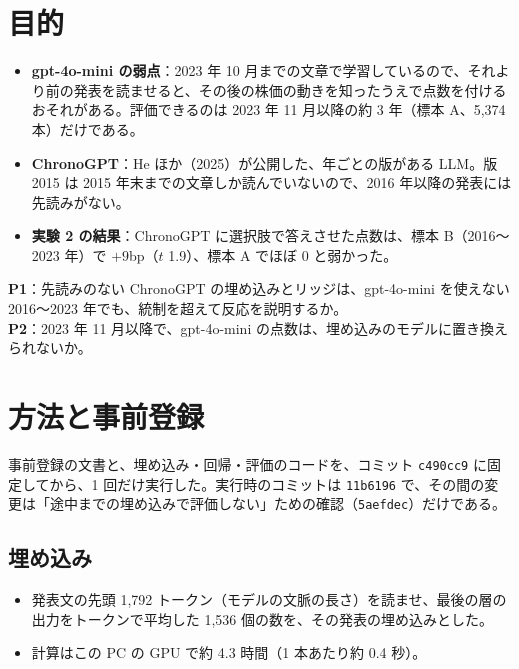 \documentclass[xelatex,ja=standard,jafont=haranoaji,a4paper,10pt,openany]{bxjsreport}
\newcommand{\code}[1]{\texttt{#1}}
\begin{document}
\setcounter{tocdepth}{1}
{\small\tableofcontents}

\chapter{目的}\label{ch:intro}

\begin{itemize}
\item \textbf{gpt-4o-mini の弱点}：2023 年 10 月までの文章で学習しているので、それより前の発表を読ませると、その後の株価の動きを知ったうえで点数を付けるおそれがある。評価できるのは 2023 年 11 月以降の約 3 年（標本 A、5,374 本）だけである。
\item \textbf{ChronoGPT}：He ほか（2025）が公開した、年ごとの版がある LLM。版 2015 は 2015 年末までの文章しか読んでいないので、2016 年以降の発表には先読みがない。
\item \textbf{実験 2 の結果}：ChronoGPT に選択肢で答えさせた点数は、標本 B（2016〜2023 年）で $+9$bp（$t$ 1.9）、標本 A でほぼ 0 と弱かった。
\end{itemize}

\begin{verdict}[問い]
\textbf{P1}：先読みのない ChronoGPT の埋め込みとリッジは、gpt-4o-mini を使えない 2016〜2023 年でも、統制を超えて反応を説明するか。\\
\textbf{P2}：2023 年 11 月以降で、gpt-4o-mini の点数は、埋め込みのモデルに置き換えられないか。
\end{verdict}

\chapter{方法と事前登録}\label{ch:method}

事前登録の文書と、埋め込み・回帰・評価のコードを、コミット \code{c490cc9} に固定してから、1 回だけ実行した。実行時のコミットは \code{11b6196} で、その間の変更は「途中までの埋め込みで評価しない」ための確認（\code{5aefdec}）だけである。

\section{埋め込み}

\begin{itemize}
\item 発表文の先頭 1,792 トークン（モデルの文脈の長さ）を読ませ、最後の層の出力をトークンで平均した 1,536 個の数を、その発表の埋め込みとした。
\item 計算はこの PC の GPU で約 4.3 時間（1 本あたり約 0.4 秒）。
\end{itemize}
\end{document}
